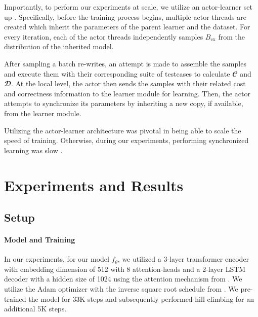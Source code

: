 \documentclass{article}
\begin{document}
Importantly, to perform our experiments at scale, we utilize an actor-learner set up  \citep{liang2018memory, espeholt2018impala}. Specifically, before the training process begins, multiple actor threads are created which inherit the parameters of the parent learner and the dataset. For every iteration, each of the actor threads independently samples $B_{\textrm{ex}}$ from the distribution of the inherited model. 

After sampling a batch re-writes, an attempt is made to assemble the samples and execute them with their corresponding suite of testcases to calculate $\mathbfcal{C}$ and $\mathbfcal{D}$. At the local level, the actor then sends the samples with their related cost and correctness information to the learner module for learning. Then, the actor attempts to synchronize its parameters by inheriting a new copy, if available, from the learner module.

Utilizing the actor-learner architecture was pivotal in being able to scale the speed of training. Otherwise, during our experiments, performing synchronized learning was slow . 


\section{Experiments and Results}
\label{sec:experiments}

\subsection{Setup}

\paragraph{Model and Training} In our experiments, for our model $f_{\theta}$, we utilized a 3-layer transformer encoder with embedding dimension of 512 with 8 attention-heads and a 2-layer LSTM decoder with a hidden size of 1024 using the attention mechanism from \citet{bahdanau2014neural}. We utilize the Adam optimizer \cite{kingma2014adam} with the inverse square root schedule from \citet{vaswani2017attention}. We pre-trained the model for 33K steps and subsequently performed hill-climbing for an additional 5K steps. 
\end{document}
